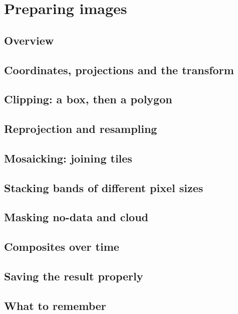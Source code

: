 \chapter{Preparing images}\label{ch:prep}

\section{Overview}


\section{Coordinates, projections and the transform}


\section{Clipping: a box, then a polygon}


\section{Reprojection and resampling}


\section{Mosaicking: joining tiles}


\section{Stacking bands of different pixel sizes}


\section{Masking no-data and cloud}


\section{Composites over time}


\section{Saving the result properly}


\section{What to remember}

